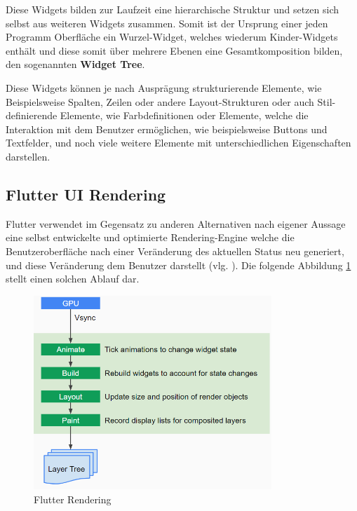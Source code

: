 \documentclass[bibliography=totoc,listof=totoc,BCOR=5mm,DIV=12,oneside]{scrbook}
\begin{document}
\par \medskip Diese Widgets bilden zur Laufzeit eine hierarchische Struktur und setzen sich selbst aus weiteren Widgets zusammen. Somit ist der Ursprung einer jeden Programm Oberfläche ein Wurzel-Widget, welches wiederum Kinder-Widgets enthält und diese somit über mehrere Ebenen eine Gesamtkomposition bilden, den sogenannten \textbf{Widget Tree}. 

\par \medskip Diese Widgets können je nach Ausprägung strukturierende Elemente, wie Beispielsweise Spalten, Zeilen oder andere Layout-Strukturen oder auch Stil-definierende Elemente, wie Farbdefinitionen oder Elemente, welche die Interaktion mit dem Benutzer ermöglichen, wie beispielsweise Buttons und Textfelder, und noch viele weitere Elemente mit unterschiedlichen Eigenschaften darstellen.

\subsection{Flutter UI Rendering}
\par Flutter verwendet im Gegensatz zu anderen Alternativen nach eigener Aussage eine selbst entwickelte und optimierte Rendering-Engine welche die Benutzeroberfläche nach einer Veränderung des aktuellen Status neu generiert, und diese Veränderung dem Benutzer darstellt (vlg. \citep[What makes Flutter unique?]{Flu3}). Die folgende Abbildung \ref{img:flutterHighLevelRendering} stellt einen solchen Ablauf dar.

\begin{figure}[H]
	\centering
	\includegraphics[width=0.8\textwidth, keepaspectratio]{Bilder/FlutterRendering.png}
	\caption{Flutter Rendering \cite{Flu5}}
	\label{img:flutterHighLevelRendering}
\end{figure}
\end{document}
